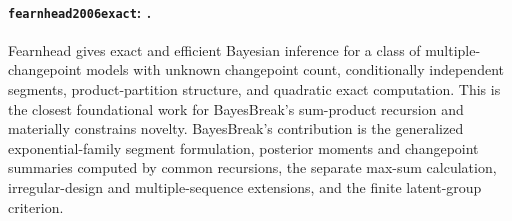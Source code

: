 
\paragraph{\texttt{fearnhead2006exact}: \citet{fearnhead2006exact}.}
Fearnhead gives exact and efficient Bayesian inference for a class of multiple-changepoint models with unknown changepoint count, conditionally independent segments, product-partition structure, and quadratic exact computation. This is the closest foundational work for BayesBreak's sum-product recursion and materially constrains novelty. BayesBreak's contribution is the generalized exponential-family segment formulation, posterior moments and changepoint summaries computed by common recursions, the separate max-sum calculation, irregular-design and multiple-sequence extensions, and the finite latent-group criterion.
